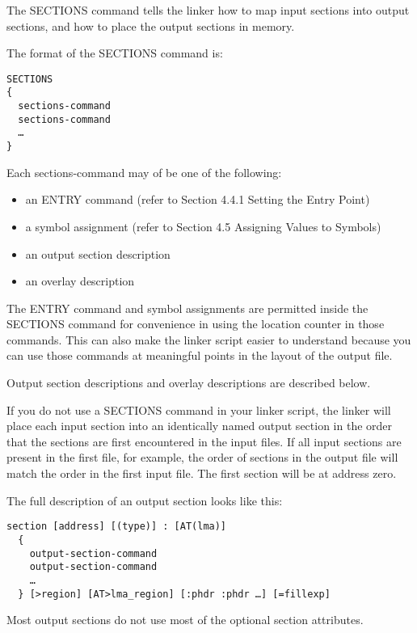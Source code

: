 \secdown

The SECTIONS command tells the linker how to map input sections into output
sections, and how to place the output sections in memory.

The format of the SECTIONS command is:

\begin{verbatim}
SECTIONS
{
  sections-command
  sections-command
  …
}
\end{verbatim}

Each sections-command may of be one of the following:

\begin{itemize}
  \item an ENTRY command (refer to Section 4.4.1 Setting the Entry Point)
  \item a symbol assignment (refer to Section 4.5 Assigning Values to Symbols)
  \item an output section description
  \item an overlay description
\end{itemize}

The ENTRY command and symbol assignments are permitted inside the SECTIONS
command for convenience in using the location counter in those commands. This
can also make the linker script easier to understand because you can use those
commands at meaningful points in the layout of the output file.

Output section descriptions and overlay descriptions are described below.

If you do not use a SECTIONS command in your linker script, the linker will
place each input section into an identically named output section in the order
that the sections are first encountered in the input files. If all input
sections are present in the first file, for example, the order of sections in
the output file will match the order in the first input file. The first section
will be at address zero.


The full description of an output section looks like this:

\begin{verbatim}
section [address] [(type)] : [AT(lma)]
  {
    output-section-command
    output-section-command
    …
  } [>region] [AT>lma_region] [:phdr :phdr …] [=fillexp]
\end{verbatim}

Most output sections do not use most of the optional section attributes.

